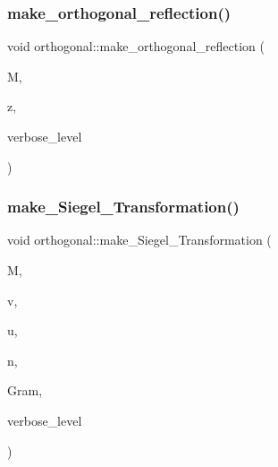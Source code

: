 \subsubsection{\texorpdfstring{make\+\_\+orthogonal\+\_\+reflection()}{make\_orthogonal\_reflection()}}
{\footnotesize\ttfamily void orthogonal\+::make\+\_\+orthogonal\+\_\+reflection (\begin{DoxyParamCaption}\item[{\mbox{\hyperlink{galois_8h_a09fddde158a3a20bd2dcadb609de11dc}{I\+NT}} $\ast$}]{M,  }\item[{\mbox{\hyperlink{galois_8h_a09fddde158a3a20bd2dcadb609de11dc}{I\+NT}} $\ast$}]{z,  }\item[{\mbox{\hyperlink{galois_8h_a09fddde158a3a20bd2dcadb609de11dc}{I\+NT}}}]{verbose\+\_\+level }\end{DoxyParamCaption})}

\mbox{\label{classorthogonal_a0edc12b4b658b09345e41b351e9e8d26}} 
\subsubsection{\texorpdfstring{make\+\_\+\+Siegel\+\_\+\+Transformation()}{make\_Siegel\_Transformation()}}
{\footnotesize\ttfamily void orthogonal\+::make\+\_\+\+Siegel\+\_\+\+Transformation (\begin{DoxyParamCaption}\item[{\mbox{\hyperlink{galois_8h_a09fddde158a3a20bd2dcadb609de11dc}{I\+NT}} $\ast$}]{M,  }\item[{\mbox{\hyperlink{galois_8h_a09fddde158a3a20bd2dcadb609de11dc}{I\+NT}} $\ast$}]{v,  }\item[{\mbox{\hyperlink{galois_8h_a09fddde158a3a20bd2dcadb609de11dc}{I\+NT}} $\ast$}]{u,  }\item[{\mbox{\hyperlink{galois_8h_a09fddde158a3a20bd2dcadb609de11dc}{I\+NT}}}]{n,  }\item[{\mbox{\hyperlink{galois_8h_a09fddde158a3a20bd2dcadb609de11dc}{I\+NT}} $\ast$}]{Gram,  }\item[{\mbox{\hyperlink{galois_8h_a09fddde158a3a20bd2dcadb609de11dc}{I\+NT}}}]{verbose\+\_\+level }\end{DoxyParamCaption})}

\mbox{\label{classorthogonal_a24bfc815e987e19df641315b98ff8822}} 

